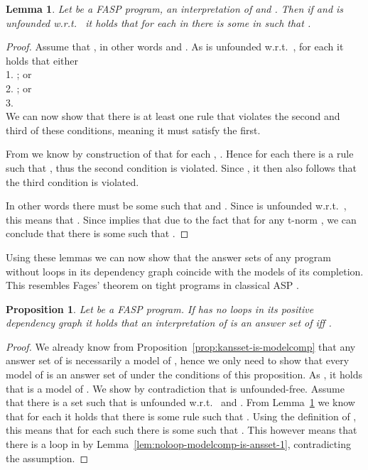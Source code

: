 \documentclass{tlp}
\newtheorem{proposition}{Proposition}
\newtheorem{lemma}{Lemma}
\begin{document}
\begin{lemma}\label{lem:noloop-modelcomp-is-ansset-2}
 Let  be a FASP program,  an interpretation of  and . Then if  and  is unfounded w.r.t.~ it holds that for each  in  there is some  in  such that . 
\end{lemma}
\begin{proof}
 Assume that , in other words  and . As  is unfounded w.r.t.~, for each  it holds that either\\
\phantom{xx}1. ; or\\
   \phantom{xx}2. ; or\\
   \phantom{xx}3. \\
We can now show that there is at least one rule  that violates the second and third of these conditions, meaning it must satisfy the first. 
  
  From  we know by construction of  that for each , . Hence for each  there is a rule  such that , thus the second condition is violated. Since , it then also follows that the third condition is violated.
  
  In other words there must be some  such that  and . Since  is unfounded w.r.t.~, this means that . Since  implies that  due to the fact that  for any t-norm , we can conclude that there is some  such that .
\end{proof}

Using these lemmas we can now show that the answer sets of any program without loops in its dependency graph coincide with the models of its completion. This resembles Fages' theorem on tight programs in classical ASP \cite{fages:completion}.

\begin{proposition}\label{prop:noloops-ansset-is-modelcomp}
 Let  be a FASP program. If  has no loops in its positive dependency graph it holds that an interpretation  of  is
 an answer set of  iff .
\end{proposition}
\begin{proof}
 We already know from Proposition~\ref{prop:kansset-is-modelcomp} that any answer set of  is necessarily a model of , hence we only need to show that every model of  is an answer set of  under the conditions of this proposition. As , it holds that  is a model of . We show by contradiction that  is unfounded-free. Assume that there is a set  such that  is unfounded w.r.t.~ and . From Lemma~\ref{lem:noloop-modelcomp-is-ansset-2} we know that for each  it holds that there is some rule  such that . Using the definition of , this means that for each such  there is some  such that . This however means that there is a loop in  by Lemma~\ref{lem:noloop-modelcomp-is-ansset-1}, contradicting the assumption.
\end{proof}
\end{document}
